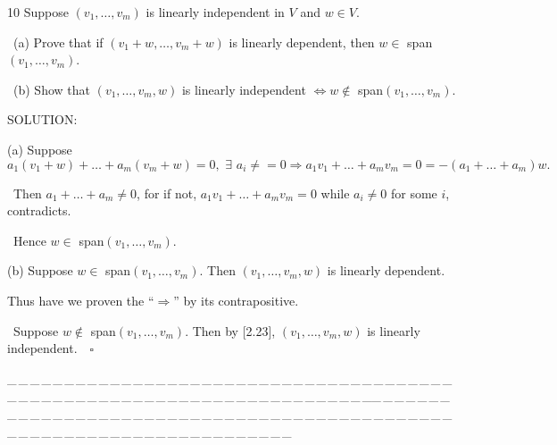 \documentclass[a4paper, 11pt, UTF8]{article}
\begin{document}
\begin{large}
{\timesbf\Large 10} {\timessl\Large 
Suppose $(v_1,\dots,v_m)$ is linearly independent in $V$ and $w\in V$.}\par\quad\,
(a) {\timessl\Large Prove that if $(v_1+w,\dots,v_m+w)$ is linearly dependent, then $w\in$ span$(v_1,\dots,v_m)$.
}\par\quad\,
(b) {\timessl\Large Show that $(v_1,\dots,v_m,w)$ is linearly independent $\Longleftrightarrow w\not\in$ span$(v_1,\dots,v_m)$.
}\par
{\timesbf S\footnotesize{OLUTION:}}\par\quad
(a) Suppose $a_1(v_1+w)+\dots+a_m(v_m+w)=0,\,\,\exists\,\,a_i\neq=0\Rightarrow a_1 v_1+\dots+a_m v_m=0=-(a_1+\dots+a_m)w.$\par\qquad\,
Then $a_1+\dots+a_m\neq 0$, for if not, $a_1 v_1+\dots+a_m v_m=0$ while $a_i\neq 0$ for some $i$, contradicts.\par\qquad\,
Hence $w\in$ span$(v_1,\dots,v_m)$.\par\quad
(b) Suppose $w\in$ span$(v_1,\dots,v_m)$. Then $(v_1,\dots,v_m,w)$ is linearly dependent.\par\qquad\qquad Thus have we proven the “$\Rightarrow$” by its contrapositive.\par\qquad\,
Suppose $w\not\in$ span$(v_1,\dots,v_m)$. Then by [2.23], $(v_1,\dots,v_m,w)$ is linearly independent. $\,\,\,\,\square$\par
{\tiny \_\,\_\,\_\,\_\,\_\,\_\,\_\,\_\,\_\,\_\,\_\,\_\,\_\,\_\,\_\,\_\,\_\,\_\,\_\,\_\,\_\,\_\,\_\,\_\,\_\,\_\,\_\,\_\,\_\,\_\,\_\,\_\,\_\,\_\,\_\,\_\,\_\,\_\,\_\,\_\,\_\,\_\,\_\,\_\,\_\,\_\,\_\,\_\,\_\,\_\,\_\,\_\,\_\,\_\,\_\,\_\,\_\,\_\,\_\,\_\,\_\,\_\,\_\,\_\,\_\,\_\,\_\,\_\,\_\,\_\,\_\_\,\_\,\_\,\_\,\_\,\_\,\_\,\_\,\_\,\_\,\_\,\_\,\_\,\_\,\_\,\_\,\_\,\_\,\_\,\_\,\_\,\_\,\_\,\_\,\_\,\_\,\_\,\_\,\_\,\_\,\_\,\_\,\_\,\_\,\_\,\_\,\_\,\_\,\_\,\_\,\_\,\_\,\_\,\_\,\_\,\_\,\_\,\_\,\_\,\_\,\_\,\_\,\_\,\_\,\_\,\_\,\_\,\_\,\_\,\_\,\_\,\_\,\_\,\_\,\_\,\_\,\_\,\_\,\_\,\_\,\_}\par


\end{large}
\end{document}
